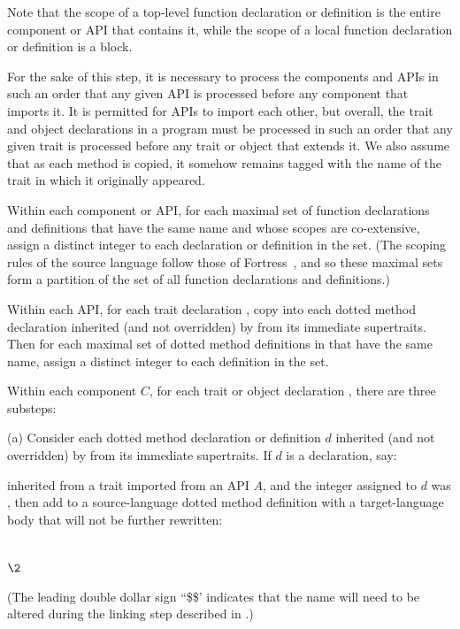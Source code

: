 Note that the scope of a top-level function declaration or definition
is the entire component or API that contains it, while the scope of
a local function declaration or definition is a block.

For the sake of this step, it is necessary to process the components and APIs
in such an order that any given API is processed before any component
that imports it.  It is permitted for APIs to import each other,
but overall, the trait and object declarations in a program must be
processed in such an order that any given trait is processed before
any trait or object that extends it.
We also assume that as each method is copied,
it somehow remains tagged with the name of the trait in which it originally appeared.

Within each component or API, for each maximal set of function
declarations and definitions that have the same name and whose
scopes are co-extensive, assign a distinct integer to each declaration
or definition in the set.  (The scoping rules of
the source language follow those of Fortress~\cite{FORTRESS-1-0}, and so these maximal sets
form a partition of the set of all function declarations and definitions.)

Within each API, for each trait declaration , copy into
 each dotted method declaration inherited (and not overridden) by
 from its immediate supertraits.  Then for each maximal set of
dotted method definitions in  that have the same name, assign a
distinct integer to each definition in the set.

Within each component $C$, for each trait or object declaration ,
there are three substeps:

(a) Consider each dotted method declaration or definition $d$ inherited (and
not overridden) by  from its immediate supertraits.
If $d$ is a declaration, say:
\begin{codeexamplesize}
\begin{tabbing}
\end{tabbing}
\end{codeexamplesize}
inherited from a trait  imported from an API $A$, and the integer assigned
to $d$ was , then
add to  a source-language dotted method definition
with a target-language body that will not be further rewritten:
\begin{codeexamplesize}
\begin{tabbing}
 \\
\(\2\)
\end{tabbing}
\end{codeexamplesize}
(The leading double dollar sign ``\$\$' indicates
that the name  will
need to be altered during the linking step described in .)


